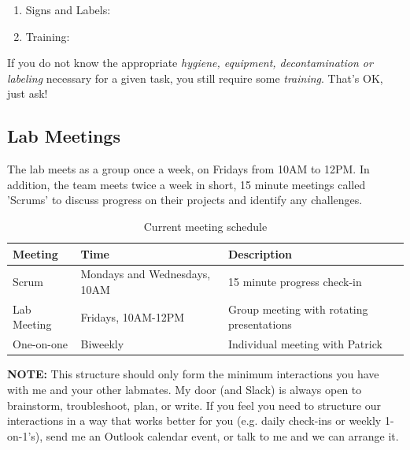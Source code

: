 \documentclass[10pt, letterpaper, twocolumn]{article} %
\begin{document}
\begin{enumerate}
	\item Signs and Labels:
	\item Training:
\end{enumerate}
If you do not know the appropriate {\it hygiene, equipment, decontamination or labeling} necessary for a given task, you still require some {\it training}. That’s OK, just ask!

\subsection{Lab Meetings}
The lab meets as a group once a week, on Fridays from 10AM to 12PM. In addition, the team meets twice a week in short, 15 minute meetings called 'Scrums' to discuss progress on their projects and identify any challenges.

\begin{table}
	\caption{Current meeting schedule}
	\centering
	\begin{tabular}{lll}
		\toprule
		Meeting & Time & Description \\
		\midrule
		Scrum & Mondays and Wednesdays, 10AM & 15 minute progress check-in \\
		Lab Meeting & Fridays, 10AM-12PM & Group meeting with rotating presentations \\
		One-on-one & Biweekly & Individual meeting with Patrick \\
		\bottomrule
	\end{tabular}
\end{table}

{\bfseries NOTE:} This structure should only form the minimum interactions you have with me and your other labmates. My door (and Slack) is always open to brainstorm, troubleshoot, plan, or write. If you feel you need to structure our interactions in a way that works better for you (e.g. daily check-ins or weekly 1-on-1's), send me an Outlook calendar event, or talk to me and we can arrange it.
\end{document}
